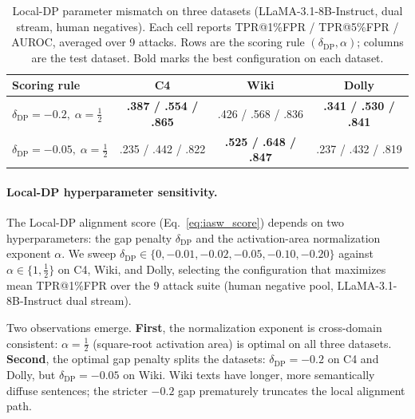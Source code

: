 
\begin{table}[htbp]
\centering
\small
\caption{Local-DP parameter mismatch on three datasets (LLaMA-3.1-8B-Instruct,
dual stream, human negatives). Each cell reports
TPR@1\%FPR / TPR@5\%FPR / AUROC, averaged over 9 attacks.
Rows are the scoring rule $(\delta_{\mathrm{DP}}, \alpha)$; columns are the test
dataset. Bold marks the best configuration on each dataset.}
\label{tab:localdp_mismatch}
\begin{tabular}{lccc}
\toprule
\textbf{Scoring rule} & \textbf{C4} & \textbf{Wiki} & \textbf{Dolly} \\
\midrule
$\delta_{\mathrm{DP}}=-0.2,\;\alpha=\tfrac12$
  & \textbf{.387 / .554 / .865} & .426 / .568 / .836 & \textbf{.341 / .530 / .841} \\
$\delta_{\mathrm{DP}}=-0.05,\;\alpha=\tfrac12$
  & .235 / .442 / .822 & \textbf{.525 / .648 / .847} & .237 / .432 / .819 \\
\bottomrule
\end{tabular}
\end{table}

\paragraph{Local-DP hyperparameter sensitivity.}
The Local-DP alignment score (Eq.~\eqref{eq:iasw_score}) depends on two
hyperparameters: the gap penalty $\delta_{\mathrm{DP}}$ and the activation-area
normalization exponent $\alpha$. We sweep
$\delta_{\mathrm{DP}} \in \{0, -0.01, -0.02, -0.05, -0.10, -0.20\}$ against
$\alpha \in \{1, \tfrac12\}$ on C4, Wiki, and Dolly, selecting the
configuration that maximizes mean TPR@1\%FPR over the 9 attack suite
(human negative pool, LLaMA-3.1-8B-Instruct dual stream).

Two observations emerge. \textbf{First}, the normalization exponent is
cross-domain consistent: $\alpha=\tfrac12$ (square-root activation area) is
optimal on all three datasets. \textbf{Second}, the optimal gap penalty splits
the datasets: $\delta_{\mathrm{DP}}=-0.2$ on C4 and Dolly, but
$\delta_{\mathrm{DP}}=-0.05$ on Wiki. Wiki texts have longer, more
semantically diffuse sentences; the stricter $-0.2$ gap prematurely truncates
the local alignment path.

